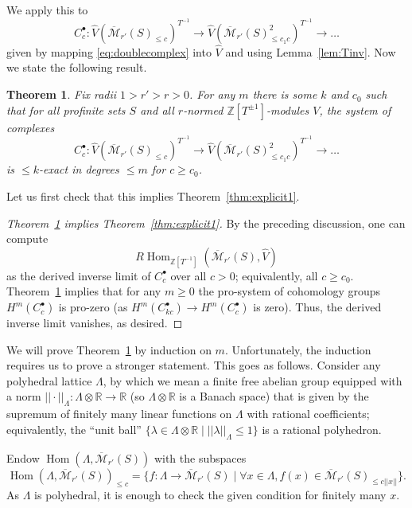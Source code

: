 \documentclass[11pt]{amsbook}
\DeclareMathOperator{\Hom}{Hom}
\renewcommand*{\hat}{\widehat}
\numberwithin{equation}{section}
\newtheorem{theorem}{Theorem}
\numberwithin{theorem}{section}
\theoremstyle{definition}
\begin{document}
We apply this to
\[
C_c^\bullet: \widehat{V}(\overline{\mathcal M}_{r'}(S)_{\leq c})^{T^{-1}}\to \widehat{V}(\overline{\mathcal M}_{r'}(S)_{\leq c_1c}^2)^{T^{-1}}\to \ldots
\]
given by mapping \eqref{eq:doublecomplex} into $\hat{V}$ and using Lemma~\ref{lem:Tinv}. Now we state the following result.

\begin{theorem}\label{thm:explicit2} Fix radii $1>r'>r>0$. For any $m$ there is some $k$ and $c_0$ such that for all profinite sets $S$ and all $r$-normed $\mathbb Z[T^{\pm 1}]$-modules $V$, the system of complexes
\[
C_c^\bullet: \widehat{V}(\overline{\mathcal M}_{r'}(S)_{\leq c})^{T^{-1}}\to \widehat{V}(\overline{\mathcal M}_{r'}(S)_{\leq c_1c}^2)^{T^{-1}}\to \ldots
\]
is $\leq k$-exact in degrees $\leq m$ for $c\geq c_0$.
\end{theorem}

Let us first check that this implies Theorem~\ref{thm:explicit1}.

\begin{proof}[Theorem~\ref{thm:explicit2} implies Theorem~\ref{thm:explicit1}] By the preceding discussion, one can compute
\[
R\Hom_{\mathbb Z[T^{-1}]}(\overline{\mathcal M}_{r'}(S),\widehat{V})
\]
as the derived inverse limit of $C_c^\bullet$ over all $c>0$; equivalently, all $c\geq c_0$. Theorem~\ref{thm:explicit2} implies that for any $m\geq 0$ the pro-system of cohomology groups $H^m(C_c^\bullet)$ is pro-zero (as $H^m(C_{kc}^\bullet)\to H^m(C_c^\bullet)$ is zero). Thus, the derived inverse limit vanishes, as desired.
\end{proof}

We will prove Theorem~\ref{thm:explicit2} by induction on $m$. Unfortunately, the induction requires us to prove a stronger statement. This goes as follows. Consider any polyhedral lattice $\Lambda$, by which we mean a finite free abelian group equipped with a norm $||\cdot||_\Lambda: \Lambda\otimes \mathbb R\to \mathbb R$ (so $\Lambda\otimes \mathbb R$ is a Banach space) that is given by the supremum of finitely many linear functions on $\Lambda$ with rational coefficients; equivalently, the ``unit ball'' $\{\lambda\in \Lambda\otimes \mathbb R\mid ||\lambda||_\Lambda\leq 1\}$ is a rational polyhedron.

Endow $\Hom(\Lambda,\overline{\mathcal M}_{r'}(S))$ with the subspaces
\[
\Hom(\Lambda,\overline{\mathcal M}_{r'}(S))_{\leq c} = \{f: \Lambda\to \overline{\mathcal M}_{r'}(S)\mid \forall x\in \Lambda, f(x)\in \overline{\mathcal M}_{r'}(S)_{\leq c||x||}\}.
\]
As $\Lambda$ is polyhedral, it is enough to check the given condition for finitely many $x$.
\end{document}

